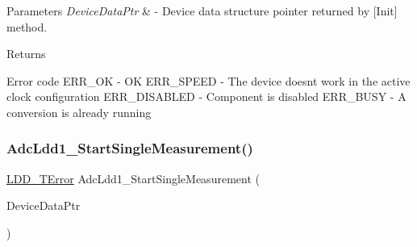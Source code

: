 \begin{DoxyParams}{Parameters}
{\em Device\+Data\+Ptr} & -\/ Device data structure pointer returned by \mbox{[}Init\mbox{]} method. \\
\hline
\end{DoxyParams}
\begin{DoxyReturn}{Returns}

\begin{DoxyItemize}
\item Error code E\+R\+R\+\_\+\+OK -\/ OK E\+R\+R\+\_\+\+S\+P\+E\+ED -\/ The device doesn\textquotesingle{}t work in the active clock configuration E\+R\+R\+\_\+\+D\+I\+S\+A\+B\+L\+ED -\/ Component is disabled E\+R\+R\+\_\+\+B\+U\+SY -\/ A conversion is already running 
\end{DoxyItemize}
\end{DoxyReturn}
\mbox{\label{group___adc_ldd1__module_ga00728ff1e652d8d8d778917ca27e37a1}} 
\subsubsection{\texorpdfstring{Adc\+Ldd1\+\_\+\+Start\+Single\+Measurement()}{AdcLdd1\_StartSingleMeasurement()}}
{\footnotesize\ttfamily \hyperlink{group___p_e___types__module_ga24c2b045fd04e79e85f261ce4df35588}{L\+D\+D\+\_\+\+T\+Error} Adc\+Ldd1\+\_\+\+Start\+Single\+Measurement (\begin{DoxyParamCaption}\item[{\hyperlink{group___p_e___types__module_gac5cf1362f1f0e3a2ce71b1bf2276d091}{L\+D\+D\+\_\+\+T\+Device\+Data} $\ast$}]{Device\+Data\+Ptr }\end{DoxyParamCaption})}



